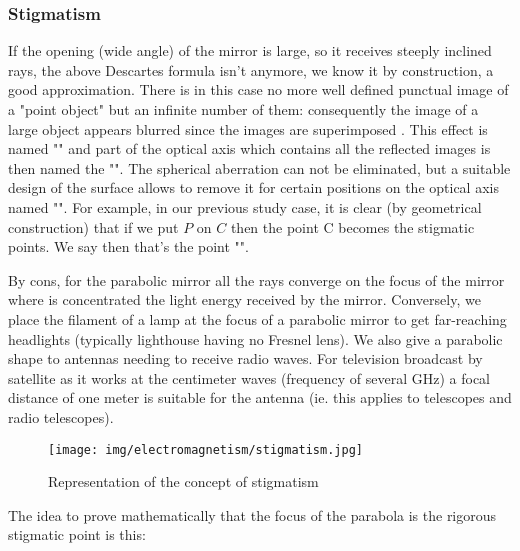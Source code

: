 	\subsubsection{Stigmatism}
	If the opening (wide angle) of the mirror is large, so it receives steeply inclined rays, the above Descartes formula isn't anymore, we know it by construction, a good approximation. There is in this case no more well defined punctual image of a "point object" but an infinite number of them: consequently the image of a large object appears blurred since the images are superimposed . This effect is named "" and part of the optical axis which contains all the reflected images is then named the "". The spherical aberration can not be eliminated, but a suitable design of the surface allows to remove it for certain positions on the optical axis named "". For example, in our previous study case, it is clear (by geometrical construction) that if we put $P$ on $C$ then the point C becomes the stigmatic points. We say then that's the point "".
	
	By cons, for the parabolic mirror all the rays converge on the focus of the mirror where is concentrated the light energy received by the mirror. Conversely, we place the filament of a lamp at the focus of a parabolic mirror to get far-reaching headlights (typically lighthouse having no Fresnel lens). We also give a parabolic shape to antennas needing to receive radio waves. For television broadcast by satellite as it works at the centimeter waves (frequency of several GHz) a focal distance of one meter is suitable for the antenna (ie. this applies to telescopes and radio telescopes).
	
	\begin{figure}[H]
		\centering
		\texttt{[image: img/electromagnetism/stigmatism.jpg]}
		\caption{Representation of the concept of stigmatism}
	\end{figure}
	The idea to prove mathematically that the focus of the parabola is the rigorous stigmatic point is this:

